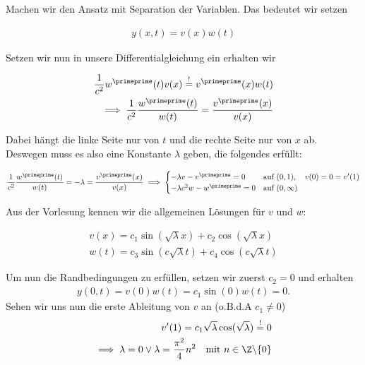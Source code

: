 \begin{solution}
Machen wir den Ansatz mit Separation der Variablen. Das bedeutet wir setzen

\begin{align*}
  y(x,t)
  =
  v(x)w(t)
\end{align*}

Setzen wir nun in unsere Differentialgleichung ein erhalten wir

\begin{align*}
  \frac{1}{c^2}w^\primeprime(t)v(x)
  \stackrel{!}{=}
  v^\primeprime(x)w(t) \\
  \implies
  \frac{1}{c^2}\frac{w^\primeprime(t)}{w(t)}
  =
  \frac{v^\primeprime(x)}{v(x)}
\end{align*}

Dabei hängt die linke Seite nur von $t$ und die rechte Seite nur von $x$ ab. Deswegen
muss es also eine Konstante $\lambda$ geben, die folgendes erfüllt:

\begin{align*}
  \frac{1}{c^2}\frac{w^\primeprime(t)}{w(t)}
  =
  -\lambda
  =
  \frac{v^\primeprime(x)}{v(x)}
  \implies
  \begin{cases}
    -\lambda v - v^\primeprime = 0 & \text{auf } (0,1), \quad v(0)=0=v^\prime(1) \\
    -\lambda c^2 w - w^\primeprime = 0 & \text{auf }(0,\infty)
  \end{cases}
\end{align*}

Aus der Vorlesung kennen wir die allgemeinen Lösungen für $v$ und  $w$:

\begin{align*}
  v(x) = c_1 \sin(\sqrt{\lambda}x) + c_2 \cos(\sqrt{\lambda}x) \\
  w(t) = c_3 \sin(c\sqrt{\lambda}t) + c_4 \cos(c\sqrt{\lambda}t)
\end{align*}

Um nun die Randbedingungen zu erfüllen, setzen wir zuerst $c_2 = 0$ und erhalten
\begin{align*}
  y(0,t) = v(0)w(t) = c_1\sin(0)w(t) = 0.
\end{align*}
Sehen wir uns nun die erste Ableitung
von $v$ an (o.B.d.A $c_1 \neq 0$)
\begin{align*}
  v^\prime(1)
  =
  c_1 \sqrt{\lambda}\cos(\sqrt{\lambda})
  \stackrel{!}{=}
  0 \\
  \implies
  \lambda = 0
  \lor
  \lambda
  =
  \frac{\pi^2}{4}n^2 \quad \text{mit } n\in \Z \backslash\{0\}
\end{align*}


\end{solution}
